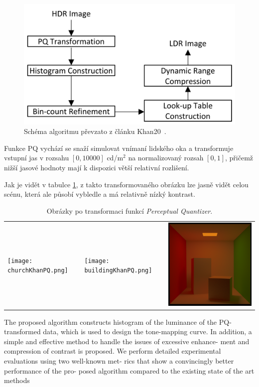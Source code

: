 \documentclass[11pt,a4paper,oneside]{article}
\begin{document}
\begin{figure}[htb]
  \begin{center}
    \includegraphics[width=0.8\linewidth]{fig/schema.png}
      \caption{Schéma algoritmu převzato z článku Khan20~\cite{Khan2020}.} 
    \label{fig:schema}
  \end{center}
\end{figure}

Funkce PQ vychází se snaží simulovat vnímaní lidského oka a transformuje
vstupní jas v rozsahu $[0, 10000]$ cd/m$^2$ na normalizovaný rozsah $[0,1]$,
přičemž nižší jasové hodnoty mají k dispozici větší relativní rozlišení.

Jak je vidět v tabulce \ref{tab:method-pq}, z takto transformovaného obrázku lze
jasně vidět celou scénu, která ale působí vybledle a má relativně nízký kontrast.

\begin{table}[htb]
    \centering
    \caption{Obrázky po transformaci funkcí \textit{Perceptual Quantizer}.}
    \label{tab:method-pq}
    \begin{tabular}{lll}
        \texttt{[image: churchKhanPQ.png]} &
        \texttt{[image: buildingKhanPQ.png]} &
        \includegraphics[width=.33\linewidth,valign=m]{cornell_boxKhanPQ.png} \\
    \end{tabular}
\end{table}

The proposed algorithm constructs histogram of
the luminance of the PQ-transformed data, which is used to
design the tone-mapping curve. In addition, a simple and
effective method to handle the issues of excessive enhance-
ment and compression of contrast is proposed. We perform
detailed experimental evaluations using two well-known met-
rics that show a convincingly better performance of the pro-
posed algorithm compared to the existing state of the art
methods
\end{document}
